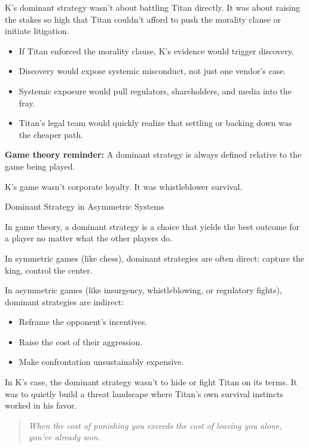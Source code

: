 \medskip

K’s dominant strategy wasn’t about battling Titan directly.
It was about raising the stakes so high that Titan couldn’t afford to push the morality clause or initiate litigation.

\medskip

\begin{itemize}
    \item If Titan enforced the morality clause, K’s evidence would trigger discovery.
    \item Discovery would expose systemic misconduct, not just one vendor’s case.
    \item Systemic exposure would pull regulators, shareholders, and media into the fray.
    \item Titan’s legal team would quickly realize that settling or backing down was the cheaper path.
\end{itemize}

\medskip

\textbf{Game theory reminder:} A dominant strategy is always defined relative to the game being played.

K’s game wasn’t corporate loyalty.
It was whistleblower survival.

\medskip

\begin{HistoricalSidebar}{Dominant Strategy in Asymmetric Systems}

In game theory, a dominant strategy is a choice that yields the best outcome for a player no matter what the other players do.

\medskip

In symmetric games (like chess), dominant strategies are often direct: capture the king, control the center.

In asymmetric games (like insurgency, whistleblowing, or regulatory fights), dominant strategies are indirect:

\begin{itemize}
    \item Reframe the opponent’s incentives.
    \item Raise the cost of their aggression.
    \item Make confrontation unsustainably expensive.
\end{itemize}

\medskip

In K’s case, the dominant strategy wasn’t to hide or fight Titan on its terms.
It was to quietly build a threat landscape where Titan’s own survival instincts worked in his favor.

\begin{quote}
    \textit{When the cost of punishing you exceeds the cost of leaving you alone, you’ve already won.}
\end{quote}

\end{HistoricalSidebar}

